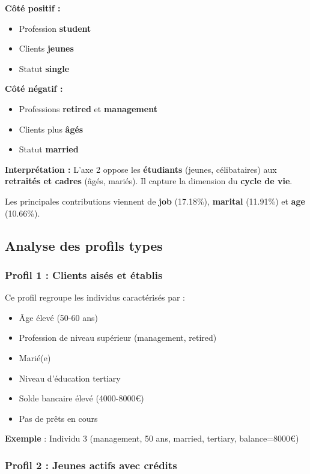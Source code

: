 \documentclass[12pt,a4paper]{article}
\begin{document}
\textbf{Côté positif :}
\begin{itemize}
    \item Profession \textbf{student}
    \item Clients \textbf{jeunes} 
    \item Statut \textbf{single}
\end{itemize}

\textbf{Côté négatif :}
\begin{itemize}
    \item Professions \textbf{retired} et \textbf{management}
    \item Clients plus \textbf{âgés}
    \item Statut \textbf{married}
\end{itemize}

\textbf{Interprétation :} L'axe 2 oppose les \textbf{étudiants} (jeunes, célibataires) aux \textbf{retraités et cadres} (âgés, mariés). Il capture la dimension du \textbf{cycle de vie}.

Les principales contributions viennent de \textbf{job} (17.18\%), \textbf{marital} (11.91\%) et \textbf{age} (10.66\%).

\subsection{Analyse des profils types}

\subsubsection{Profil 1 : Clients aisés et établis}

Ce profil regroupe les individus caractérisés par :
\begin{itemize}
    \item Âge élevé (50-60 ans)
    \item Profession de niveau supérieur (management, retired)
    \item Marié(e)
    \item Niveau d'éducation tertiary
    \item Solde bancaire élevé (4000-8000€)
    \item Pas de prêts en cours
\end{itemize}

\textbf{Exemple} : Individu 3 (management, 50 ans, married, tertiary, balance=8000€)

\subsubsection{Profil 2 : Jeunes actifs avec crédits}
\end{document}

